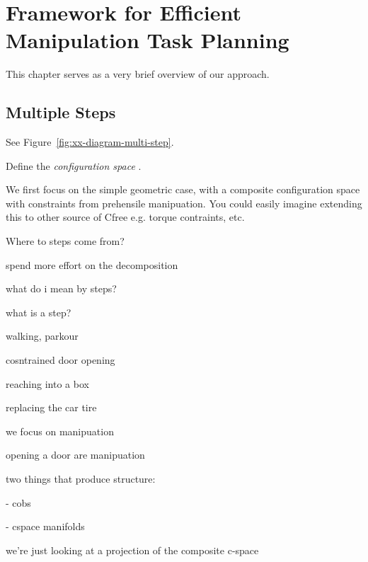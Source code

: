 \chapter{Framework for Efficient Manipulation Task Planning}

This chapter serves as a very brief
overview of our approach.

\section{Multiple Steps}
\label{chap:formulation}

See Figure~\ref{fig:xx-diagram-multi-step}.

Define the \emph{configuration space} \cite{lozanoperez1983cspace}.

We first focus on the simple geometric case,
with a composite configuration space
with constraints from prehensile manipuation.
You could easily imagine extending this to other source of Cfree
e.g. torque contraints, etc.

Where to steps come from?

spend more effort on the decomposition

what do i mean by steps?

what is a step?

walking, parkour

cosntrained door opening

reaching into a box

replacing the car tire

we focus on manipuation

opening a door are manipuation

two things that produce structure:

- cobs

- cspace manifolds

we're just looking at a projection of the composite c-space

